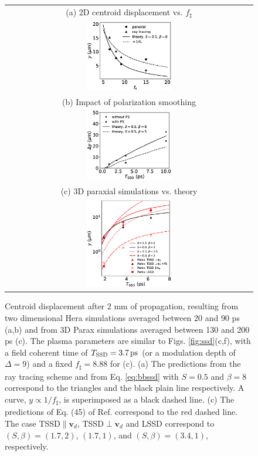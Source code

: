 \documentclass[%
 reprint,
 amsmath,amssymb,
 aps,
]{revtex4-1}
\begin{document}
\begin{figure}
\begin{tabular}{c}
(a) 2D centroid displacement vs. $f_\sharp$ \\
\includegraphics[width=0.35\textwidth]{Fig3a.eps}\\
(b) Impact of polarization smoothing\\
\includegraphics[width=0.35\textwidth]{Fig3psHe.eps}\\
(c) 3D paraxial simulations vs. theory \\
\includegraphics[width=0.35\textwidth]{Fig3c.eps}
\end{tabular}
\caption{ \label{fig:ssd3d} 
Centroid displacement after 2 mm of propagation,  resulting from two dimensional Hera simulations \cite[]{Loiseau_2006} averaged between 20 and 90 ps (a,b) and from 3D Parax \cite[]{POP_Riazuelo_2000} simulations averaged between 130 and 200 ps (c). The plasma parameters are similar to Figs. \ref{fig:ssd}(c,f), with a field coherent time of $T_\mathrm{SSD}=3.7\,\rm ps$ (or a modulation depth of $\Delta=9$) and a fixed $f_\sharp=8.88$ for (c).
(a) The predictions from the ray tracing scheme and from Eq. \eqref{eq:bbssd} with $S=0.5$ and $\beta=8$ correspond to the triangles and the black plain line respectively. A curve, $y\propto 1/f_\sharp$, is superimposed as a black dashed line. 
(c) The  predictions of Eq. (45) of Ref. \cite[]{POP_Rose_Ghosal_98} correspond to the red dashed line.
The case TSSD$\parallel \mathbf{v}_d$, TSSD$\perp \mathbf{v}_d$ and LSSD correspond to $(S,\beta)=(1.7,2)$, $(1.7,1)$, and $(S,\beta)=(3.4,1)$, respectively.
}
\end{figure}
\end{document}
